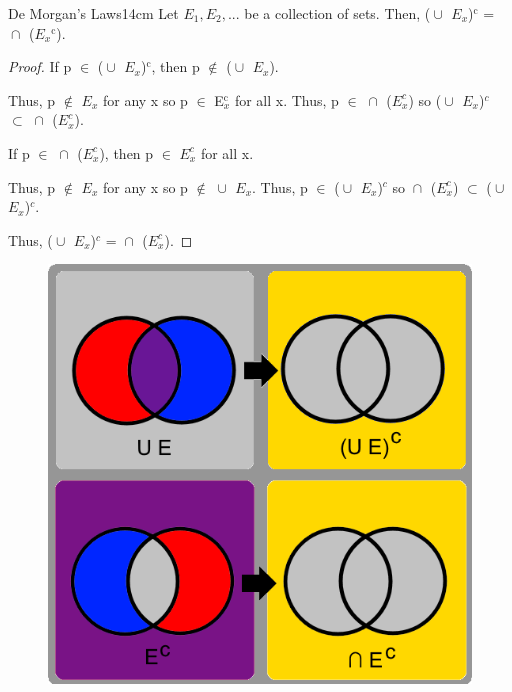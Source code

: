 	\vspace{0.5cm}



	\begin{wtheorem}{De Morgan's Laws}{14cm}
		Let $E_1, E_2 , ... $ be a collection of sets. Then,
		($\cup_{}^{}$ $E_x$)$^\text{c}$ = $\cap_{}^{}$ ($E_x$$^\text{c}$).		 
	\end{wtheorem}
	 
	\begin{proof}
		If p $\in$ ($\cup_{}^{}$ $E_x$)$^\text{c}$, then
		p $\not \in$ ($\cup_{}^{}$ $E_x$).

		Thus, p $\not \in$ $E_x$ for any x so p $\in$ E$_x^\text{c}$ for all x.
		Thus, p $\in$ $\cap_{}^{}$ ($E_x^c$) so
		($\cup_{}^{}$ $E_x$)$^c$ $\subset$ $\cap_{}^{}$ ($E_x^c$).

		If p $\in$ $\cap_{}^{}$ ($E_x^c$), then p $\in$ $E_x^c$ for all x.
		
		Thus, p $\not \in$ $E_x$ for any x so p $\not \in$ $\cup_{}^{}$ $E_x$.
		Thus, p $\in$ ($\cup_{}^{}$ $E_x$)$^c$ so
		$\cap_{}^{}$ ($E_x^c$) $\subset$ ($\cup_{}^{}$ $E_x$)$^c$.
		
		Thus, ($\cup_{}^{}$ $E_x$)$^c$ = $\cap_{}^{}$ ($E_x^c$). 
	\end{proof}



	\begin{figure}[h]
		\centering
		\includegraphics[scale=0.35]{Images/5.1.6.png}
	\end{figure}

